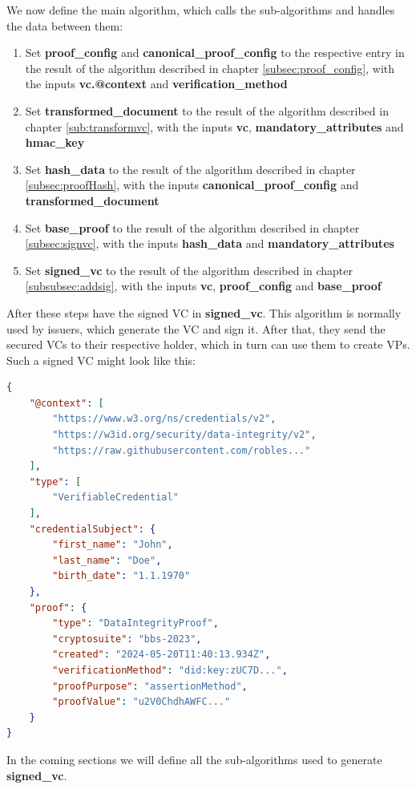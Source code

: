\documentclass[
	a4paper               %
	,BCOR=0mm            %
	,bibliography=totoc   %
	,listof=totoc         %
	,monolingual
	,twoside=false
]{bfhthesis}              %
\begin{document}
We now define the main algorithm, which calls the sub-algorithms and handles the data between them:
\begin{enumerate}
	\item Set \textbf{proof\_config} and \textbf{canonical\_proof\_config} to the respective entry in the result of the algorithm described in chapter \ref{subsec:proof_config}, with the inputs \textbf{vc.@context} and \textbf{verification\_method}
	\item Set \textbf{transformed\_document} to the result of the algorithm described in chapter \ref{sub:transformvc}, with the inputs \textbf{vc}, \textbf{mandatory\_attributes} and \textbf{hmac\_key}
	\item Set \textbf{hash\_data} to the result of the algorithm described in chapter \ref{subsec:proofHash}, with the inputs \textbf{canonical\_proof\_config} and \textbf{transformed\_document}
	\item Set \textbf{base\_proof} to the result of the algorithm described in chapter \ref{subsec:signvc}, with the inputs \textbf{hash\_data} and \textbf{mandatory\_attributes}
	\item Set \textbf{signed\_vc} to the result of the algorithm described in chapter \ref{subsubsec:addsig}, with the inputs \textbf{vc}, \textbf{proof\_config} and \textbf{base\_proof}
\end{enumerate}

After these steps have the signed VC in \textbf{signed\_vc}.
This algorithm is normally used by issuers, which generate the VC and sign it.
After that, they send the secured VCs to their respective holder, which in turn can use them to create VPs.
Such a signed VC might look like this:
\newpage
\begin{lstlisting}[language=json,firstnumber=1,caption={Signed VC},captionpos=b, label={list:signed-vc}]
{
	"@context": [
		"https://www.w3.org/ns/credentials/v2",
		"https://w3id.org/security/data-integrity/v2",
		"https://raw.githubusercontent.com/robles..."
	],
	"type": [
		"VerifiableCredential"
	],
	"credentialSubject": {
		"first_name": "John",
		"last_name": "Doe",
		"birth_date": "1.1.1970"
	},
	"proof": {
		"type": "DataIntegrityProof",
		"cryptosuite": "bbs-2023",
		"created": "2024-05-20T11:40:13.934Z",
		"verificationMethod": "did:key:zUC7D...",
		"proofPurpose": "assertionMethod",
		"proofValue": "u2V0ChdhAWFC..."
	}
}
\end{lstlisting}

In the coming sections we will define all the sub-algorithms used to generate \\\textbf{signed\_vc}.
\end{document}
